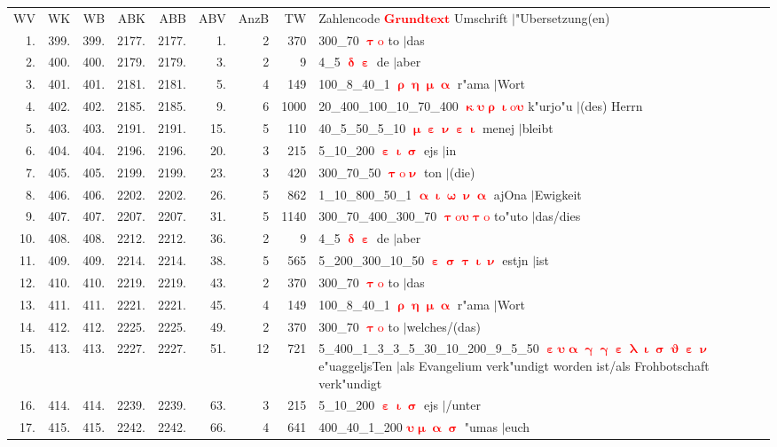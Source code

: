 \documentclass[a4paper,10pt,landscape]{article}
\begin{document}
\begin{tabular}{rrrrrrrrp{120mm}}
WV&WK&WB&ABK&ABB&ABV&AnzB&TW&Zahlencode \textcolor{red}{$\boldsymbol{Grundtext}$} Umschrift $|$"Ubersetzung(en)\\
1.&399.&399.&2177.&2177.&1.&2&370&300\_70 \textcolor{red}{$\boldsymbol{\uptau\mathrm{o}}$} to $|$das\\
2.&400.&400.&2179.&2179.&3.&2&9&4\_5 \textcolor{red}{$\boldsymbol{\updelta\upepsilon}$} de $|$aber\\
3.&401.&401.&2181.&2181.&5.&4&149&100\_8\_40\_1 \textcolor{red}{$\boldsymbol{\uprho\upeta\upmu\upalpha}$} r"ama $|$Wort\\
4.&402.&402.&2185.&2185.&9.&6&1000&20\_400\_100\_10\_70\_400 \textcolor{red}{$\boldsymbol{\upkappa\upsilon\uprho\upiota\mathrm{o}\upsilon}$} k"urjo"u $|$(des) Herrn\\
5.&403.&403.&2191.&2191.&15.&5&110&40\_5\_50\_5\_10 \textcolor{red}{$\boldsymbol{\upmu\upepsilon\upnu\upepsilon\upiota}$} menej $|$bleibt\\
6.&404.&404.&2196.&2196.&20.&3&215&5\_10\_200 \textcolor{red}{$\boldsymbol{\upepsilon\upiota\upsigma}$} ejs $|$in\\
7.&405.&405.&2199.&2199.&23.&3&420&300\_70\_50 \textcolor{red}{$\boldsymbol{\uptau\mathrm{o}\upnu}$} ton $|$(die)\\
8.&406.&406.&2202.&2202.&26.&5&862&1\_10\_800\_50\_1 \textcolor{red}{$\boldsymbol{\upalpha\upiota\upomega\upnu\upalpha}$} ajOna $|$Ewigkeit\\
9.&407.&407.&2207.&2207.&31.&5&1140&300\_70\_400\_300\_70 \textcolor{red}{$\boldsymbol{\uptau\mathrm{o}\upsilon\uptau\mathrm{o}}$} to"uto $|$das/dies\\
10.&408.&408.&2212.&2212.&36.&2&9&4\_5 \textcolor{red}{$\boldsymbol{\updelta\upepsilon}$} de $|$aber\\
11.&409.&409.&2214.&2214.&38.&5&565&5\_200\_300\_10\_50 \textcolor{red}{$\boldsymbol{\upepsilon\upsigma\uptau\upiota\upnu}$} estjn $|$ist\\
12.&410.&410.&2219.&2219.&43.&2&370&300\_70 \textcolor{red}{$\boldsymbol{\uptau\mathrm{o}}$} to $|$das\\
13.&411.&411.&2221.&2221.&45.&4&149&100\_8\_40\_1 \textcolor{red}{$\boldsymbol{\uprho\upeta\upmu\upalpha}$} r"ama $|$Wort\\
14.&412.&412.&2225.&2225.&49.&2&370&300\_70 \textcolor{red}{$\boldsymbol{\uptau\mathrm{o}}$} to $|$welches/(das)\\
15.&413.&413.&2227.&2227.&51.&12&721&5\_400\_1\_3\_3\_5\_30\_10\_200\_9\_5\_50 \textcolor{red}{$\boldsymbol{\upepsilon\upsilon\upalpha\upgamma\upgamma\upepsilon\uplambda\upiota\upsigma\upvartheta\upepsilon\upnu}$} e"uaggeljsTen $|$als Evangelium verk"undigt worden ist/als Frohbotschaft verk"undigt\\
16.&414.&414.&2239.&2239.&63.&3&215&5\_10\_200 \textcolor{red}{$\boldsymbol{\upepsilon\upiota\upsigma}$} ejs $|$/unter\\
17.&415.&415.&2242.&2242.&66.&4&641&400\_40\_1\_200 \textcolor{red}{$\boldsymbol{\upsilon\upmu\upalpha\upsigma}$} "umas $|$euch\\
\end{tabular}\medskip \\
\end{document}
